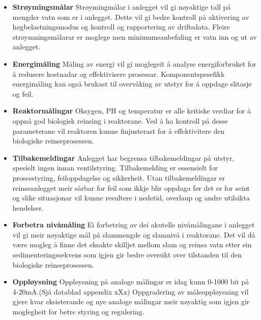 \begin{itemize}
    \item \textbf{Strøymingsmålar} \newline
        Strøymingmålar i anlegget vil gi nøyaktige tall på mengder vatn som er i anlegget.
        Dette vil gi bedre kontroll på aktivering av høgbelastningsmodus og kontroll og rapportering av driftsdata.
        Fleire strøymningsmålarar er moglege men minimumsanbefaling er vatn inn og ut av anlegget.
    \item \textbf{Energimåling} \newline
        Måling av energi vil gi moglegeit å analyse energiforbruket for å redusere kostnadar og effektivisere prosessar.
        Komponentspesefikk energimåling kan også brukast til overvåking av utstyr for å oppdage slitasje og feil.
    \item \textbf{Reaktormålingar} \newline
        Oksygen, PH og temperatur er alle kritiske verdiar for å oppnå god biologisk reinsing i reaktorane. \newline
        Ved å ha kontroll på desse parameterane vil reaktoren kunne finjusterast for å effektivitere den biologiske reinseprosessen.
    \item \textbf{Tilbakemeldingar} \newline
        Anlegget har begrensa tilbakemeldingar på utstyr, spesielt ingen innan ventilstyring.
        Tilbakemelding er essensielt for prosesstyring, feiloppdagelse og sikkerheit.
        Utan tilbakemeldingar er reinseanlegget meir sårbar for feil som ikkje blir oppdaga før det er for seint 
        og slike situasjonar vil kunne resultere i nedetid, overlaup og andre utilsikta hendelser.
    \item \textbf{Forbetra nivåmåling} \newline
        Ei forbetring av dei akutelle nivåmålingane i anlegget vil gi meir nøyaktige mål på slammengde og slamnivå i reaktorane.
        Det vil då være mogleg å finne det eksakte skilljet mellom slam og reinsa vatn etter ein sedimenteringssekvens som igjen
        gir bedre oversikt over tilstanden til den biologiske reinseprosessen.
    \item \textbf{Oppløysning} \newline
        Oppløysning på analoge målingar er idag kunn 0-1000 bit på 4-20mA.(Sjå datablad appendix xXx) \newline
        Oppgradering av måleoppløysning vil gjere kvar eksisterande og nye analoge målingar
        meir nøyaktig som igjen gir moglegheit for betre styring og regulering.
\end{itemize}
\newpage

